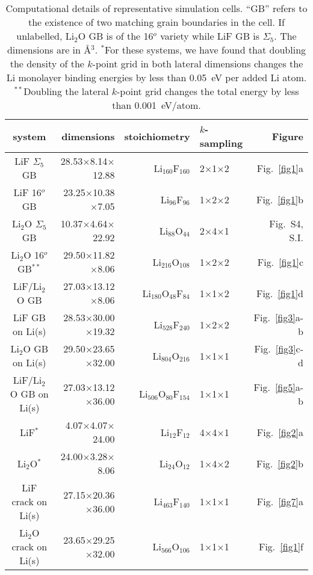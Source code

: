 \documentclass[prb,preprint,amsmath,amssymb]{revtex4}
\begin{document}
\begin{table}\centering
\begin{tabular}{c|r|r|l|r} \hline
system & dimensions & stoichiometry & $k$-sampling & Figure \\ \hline
LiF $\Sigma_5$ GB &  28.53$\times$8.14$\times$12.88 & Li$_{160}$F$_{160}$ &
          2$\times$1$\times$2  & Fig.~\ref{fig1}a \\
LiF 16$^o$ GB &  23.25$\times$10.38$\times$7.05 & Li$_{96}$F$_{96}$ &
          1$\times$2$\times$2  & Fig.~\ref{fig1}b \\
Li$_2$O $\Sigma_5$ GB & 10.37$\times$4.64$\times$22.92 & Li$_{88}$O$_{44}$ &
          2$\times$4$\times$1  & Fig.~S4, S.I. \\
Li$_2$O 16$^o$ GB$^{**}$& 29.50$\times$11.82$\times$8.06 & Li$_{216}$O$_{108}$
        & 1$\times$2$\times$2  & Fig.~\ref{fig1}c \\
LiF/Li$_2$O GB & 27.03$\times$13.12$\times$8.06 & Li$_{180}$O$_{48}$F$_{84}$ &
          1$\times$1$\times$2  & Fig.~\ref{fig1}d \\
LiF GB on Li(s) &  28.53$\times$30.00$\times$19.32 & Li$_{528}$F$_{240}$ &
          1$\times$2$\times$2  & Fig.~\ref{fig3}a-b \\
Li$_2$O GB on Li(s) & 29.50$\times$23.65$\times$32.00 &
        Li$_{804}$O$_{216}$ & 1$\times$1$\times$1 & Fig.~\ref{fig3}c-d \\
LiF/Li$_2$O GB on Li(s) & 27.03$\times$13.12$\times$36.00 &
        Li$_{506}$O$_{80}$F$_{154}$ & 1$\times$1$\times$1 & Fig.~\ref{fig5}a-b\\
LiF$^*$ & 4.07$\times$4.07$\times$24.00 & Li$_{12}$F$_{12}$ &
          4$\times$4$\times$1  & Fig.~\ref{fig2}a \\
Li$_2$O$^*$ & 24.00$\times$3.28$\times$8.06 & Li$_{24}$O$_{12}$ &
          1$\times$4$\times$2  & Fig.~\ref{fig2}b \\
LiF crack on Li(s) & 27.15$\times$20.36$\times$36.00 & Li$_{463}$F$_{140}$ &
          1$\times$1$\times$1  & Fig.~\ref{fig7}a \\
Li$_2$O crack on Li(s) & 23.65$\times$29.25$\times$32.00& Li$_{566}$O$_{106}$ &
          1$\times$1$\times$1  & Fig.~\ref{fig1}f \\
\hline
\end{tabular}
\caption[]
{\label{table1} \noindent
Computational details of representative simulation cells.  ``GB'' refers to
the existence of two matching grain boundaries in the cell.  If unlabelled,
Li$_2$O GB is of the 16$^o$ variety while LiF GB is $\Sigma_5$.  The dimensions
are in \AA$^3$.  $^*$For these systems, we have found that doubling the
density of the $k$-point grid in both lateral dimensions changes the
Li monolayer binding energies by less than 0.05~eV per added Li atom.
$^{**}$Doubling the lateral $k$-point grid changes the total energy by
less than 0.001~eV/atom.
}
\end{table}
\end{document}
